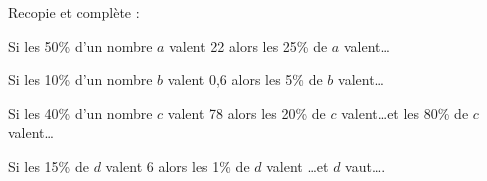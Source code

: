 Recopie et complète :
\begin{myenumerate}
\item Si les 50\% d'un nombre $a$ valent 22 alors les 25\% de $a$ valent\ldots
\item Si les 10\% d'un nombre $b$ valent 0,6 alors les 5\% de $b$ valent\ldots
\item Si les 40\% d'un nombre $c$ valent 78 alors les 20\% de $c$ valent\ldots et les 80\% de $c$ valent\ldots
\item Si les 15\% de $d$ valent 6 alors les 1\% de $d$ valent \ldots et $d$ vaut\ldots.
\end{myenumerate}
